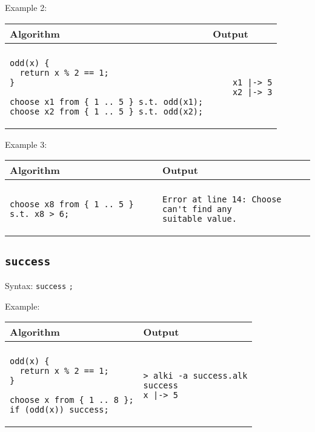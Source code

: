 \documentclass[a4paper]{report}
\begin{document}
Example 2:
\begin{center}
\begin{tabular}{ll}
Algorithm & Output\\
\hline
\\
\begin{minipage}{.45\textwidth}
\begin{verbatim}
odd(x) {
  return x % 2 == 1;
}

choose x1 from { 1 .. 5 } s.t. odd(x1);
choose x2 from { 1 .. 5 } s.t. odd(x2);
\end{verbatim}
\end{minipage}
&
\begin{minipage}{.45\textwidth}
\begin{verbatim}
    x1 |-> 5
    x2 |-> 3
\end{verbatim}
\end{minipage}
\end{tabular}
\end{center}

Example 3:
\begin{center}
\begin{tabular}{ll}
Algorithm & Output\\
\hline
\\
\begin{minipage}{.45\textwidth}
\begin{verbatim}
choose x8 from { 1 .. 5 } s.t. x8 > 6;
\end{verbatim}
\end{minipage}
&
\begin{minipage}{.45\textwidth}
\begin{verbatim}
Error at line 14: Choose can't find any
suitable value.
\end{verbatim}
\end{minipage}
\end{tabular}
\end{center}


\subsection{\texttt{success}}

Syntax: \verb"success" \verb";"

Example:
\begin{center}
\begin{tabular}{ll}
Algorithm & Output\\
\hline
\\
\begin{minipage}{.45\textwidth}
\begin{verbatim}
odd(x) {
  return x % 2 == 1;
}

choose x from { 1 .. 8 };
if (odd(x)) success;
\end{verbatim}
\end{minipage}
&
\begin{minipage}{.45\textwidth}
\begin{verbatim}
> alki -a success.alk
success
x |-> 5
\end{verbatim}
\end{minipage}
\end{tabular}
\end{center}
\end{document}
